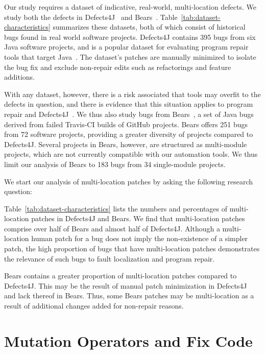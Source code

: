 \documentclass[sigconf, timestamp-false, anonymous=true]{acmart}
\begin{document}
Our study requires a dataset of indicative, real-world,
multi-location defects.  We study both the defects in
Defects4J~\cite{defects4j} and Bears~\cite{bears}.  Table~\ref{tab:dataset-characteristics}
summarizes these datasets, both of which
consist of historical
bugs found in real world software projects. Defects4J contains 395 bugs from 
six Java software projects, and is a popular dataset for evaluating 
program repair tools that target Java~\cite{durieux-repair-them-all}.
The dataset's patches are manually minimized to isolate the bug fix 
and exclude non-repair edits such as refactorings and feature additions.

With any dataset, however, there is a risk associated that tools may overfit
to the defects in question, and there is evidence that this situation applies to
program repair and Defects4J~\cite{durieux-repair-them-all}. 
We thus also study bugs from Bears~\cite{bears}, 
a set of Java bugs derived from failed Travis-CI builds of GitHub projects. 
Bears offers 251 bugs from 72 software projects, providing a greater diversity of 
projects compared to Defects4J. 
Several projects in Bears, however, are structured as multi-module projects, 
which are not currently compatible with our automation tools.
We thus limit our analysis of Bears to 183 bugs from 34 single-module projects.


We start our analysis of multi-location patches by asking the following research question:

Table~\ref{tab:dataset-characteristics} lists the numbers and percentages of
multi-location patches in Defects4J and Bears. 
We find that multi-location patches comprise over half of Bears and almost half of Defects4J.
Although a multi-location human patch for a bug does not imply the 
non-existence of a simpler patch, the high proportion of bugs that have 
multi-location patches demonstrates the relevance of such bugs to fault localization and
program repair. 

Bears contains a greater proportion of 
multi-location patches compared to Defects4J. This may be the 
result of manual patch minimization in Defects4J~\cite{defects4j} 
and lack thereof in Bears.
Thus, some Bears patches may be multi-location as a result of additional 
changes added for non-repair reasons.






\section{Mutation Operators and Fix Code}
\label{sec:mutops}
\end{document}
